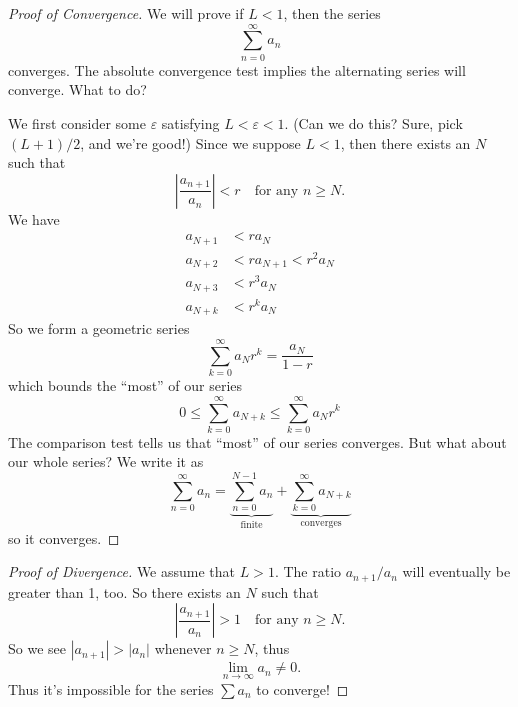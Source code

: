 \begin{proof}[Proof of Convergence]
We will prove if $L<1$, then the series
\begin{equation}
\sum^{\infty}_{n=0}a_{n}
\end{equation}
converges. The absolute convergence test implies the alternating
series will converge. What to do?

We first consider some $\varepsilon$ satisfying
$L<\varepsilon<1$. (Can we do this? Sure, pick $(L+1)/2$, and
we're good!) Since we suppose $L<1$, then there exists an $N$
such that
\begin{equation}
\left|\frac{a_{n+1}}{a_{n}}\right|<r\quad\mbox{for any }n\geq N.
\end{equation}
We have
\begin{equation}
\begin{aligned}
a_{N+1}&<r a_{N}\\
a_{N+2}&<r a_{N+1}<r^{2}a_{N}\\
a_{N+3}&<r^{3}a_{N}\\
a_{N+k}&<r^{k}a_{N}
\end{aligned}
\end{equation}
So we form a geometric series
\begin{equation}
\sum^{\infty}_{k=0}a_{N}r^{k} = \frac{a_{N}}{1-r}
\end{equation}
which bounds the ``most'' of our series
\begin{equation}
0\leq\sum^{\infty}_{k=0}a_{N+k}\leq\sum^{\infty}_{k=0}a_{N}r^{k}
\end{equation}
The comparison test tells us that ``most'' of our series
converges. But what about our whole series? We write it as
\begin{equation}
\sum^{\infty}_{n=0}a_{n} = \underbrace{\sum^{N-1}_{n=0}a_{n}}_{\text{finite}}+\underbrace{\sum^{\infty}_{k=0}a_{N+k}}_{\text{converges}}
\end{equation}
so it converges.
\end{proof}

\begin{proof}[Proof of Divergence]
We assume that $L>1$. The ratio $a_{n+1}/a_{n}$ will eventually
be greater than 1, too. So there exists an $N$ such that
\begin{equation}
\left|\frac{a_{n+1}}{a_{n}}\right|>1\quad\mbox{for any }n\geq N.
\end{equation}
So we see $|a_{n+1}|>|a_{n}|$ whenever $n\geq N$, thus
\begin{equation}
\lim_{n\to\infty}a_{n}\not=0.
\end{equation}
Thus it's impossible for the series $\sum a_{n}$ to converge!
\end{proof}


